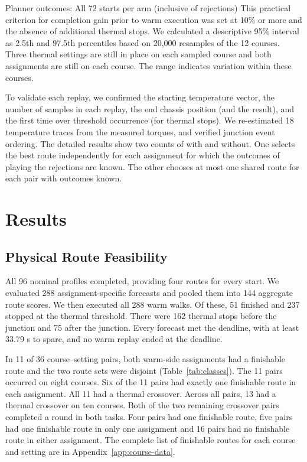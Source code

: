 \documentclass{ieeeaccess}
\begin{document}
Planner outcomes: All 72 starts per arm (inclusive of rejections) This practical criterion for completion gain prior to warm execution was set at 10\% or more and the absence of additional thermal stops. We calculated a descriptive 95\% interval as 2.5th and 97.5th percentiles based on 20,000 resamples of the 12 courses. Three thermal settings are still in place on each sampled course and both assignments are still on each course. The range indicates variation within these courses.

To validate each replay, we confirmed the starting temperature vector, the number of samples in each replay, the end chassis position (and the result), and the first time over threshold occurrence (for thermal stops). We re-estimated 18 temperature traces from the measured torques, and verified junction event ordering. The detailed results show two counts of \textquotedbl{}with\textquotedbl{} and \textquotedbl{}without. One selects the best route independently for each assignment for which the outcomes of playing the rejections are known. The other chooses at most one shared route for each pair with outcomes known.

\section{Results}

\subsection{Physical Route Feasibility}

All 96 nominal profiles completed, providing four routes for every start. We evaluated 288 assignment-specific forecasts and pooled them into 144 aggregate route scores. We then executed all 288 warm walks. Of these, 51 finished and 237 stopped at the thermal threshold. There were 162 thermal stops before the junction and 75 after the junction. Every forecast met the deadline, with at least 33.79 s to spare, and no warm replay ended at the deadline.

In 11 of 36 course--setting pairs, both warm-side assignments had a finishable route and the two route sets were disjoint (Table~\ref{tab:classes}). The 11 pairs occurred on eight courses. Six of the 11 pairs had exactly one finishable route in each assignment. All 11 had a thermal crossover. Across all pairs, 13 had a thermal crossover on ten courses. Both of the two remaining crossover pairs completed a round in both tasks. Four pairs had one finishable route, five pairs had one finishable route in only one assignment and 16 pairs had no finishable route in either assignment. The complete list of finishable routes for each course and setting are in Appendix~\ref{app:course-data}.
\end{document}
